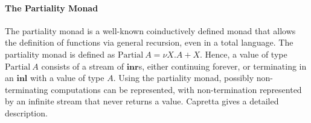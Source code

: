 \documentclass[natbib]{sigplanconf}
\newcommand{\cons}[1]{\textcolor{cons}{\textsf{#1}}}
\newcommand{\kw}[1]{\textbf{#1}}
\newcommand{\tyname}[1]{\textrm{#1}}
\newcommand{\ident}[1]{\textit{#1}}
\newcommand{\defn}[1]{\textcolor{defnd}{\ident{#1}}}
\begin{document}
%


\paragraph{The Partiality Monad} The partiality monad is a well-known
coinductively defined monad that allows the definition of functions
via general recursion, even in a total language. The partiality monad
is defined as $\tyname{Partial}~A = \nu X. A + X$. Hence, a value of
type $\tyname{Partial}~A$ consists of a stream of $\kw{inr}$s, either
continuing forever, or terminating in an $\kw{inl}$ with a value of
type $A$. Using the partiality monad, possibly non-terminating
computations can be represented, with non-termination represented by
an infinite stream that never returns a value. Capretta
\cite{capretta05general} gives a detailed description.
\end{document}
